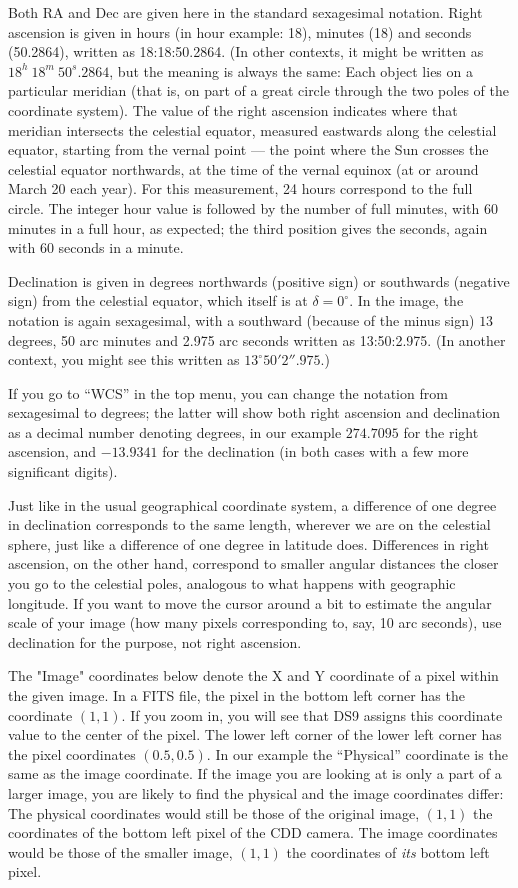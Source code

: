 \documentclass[twocolumn,apj]{openjournal}
\begin{document}
Both RA and Dec are given here in the standard sexagesimal notation. Right ascension is given in hours (in hour example: 18), minutes (18) and seconds (50.2864), written as 18:18:50.2864. (In other contexts, it might be written as $18^h\:18^m\:50^s.2864$, but the meaning is always the same: Each object lies on a particular meridian (that is, on part of a great circle through the two poles of the coordinate system). The value of the right ascension indicates where that meridian intersects the celestial equator, measured eastwards along the celestial equator, starting from the vernal point --- the point where the Sun crosses the celestial equator northwards, at the time of the vernal equinox (at or around March 20 each year). For this measurement, 24 hours correspond to the full circle. The integer hour value is followed by the number of full minutes, with 60 minutes in a full hour, as expected; the third position gives the seconds, again with 60 seconds in a minute.

Declination is given in degrees northwards (positive sign) or southwards (negative sign) from the celestial equator, which itself is at $\delta=0^{\circ}$. In the image, the notation is again sexagesimal, with a southward (because of the minus sign) $13$ degrees, 50 arc minutes and 2.975 arc seconds written as 13:50:2.975. (In another context, you might see this written as $13^{\circ}50'2''.975.$)

If you go to ``WCS'' in the top menu, you can change the notation from sexagesimal to degrees; the latter will show both right ascension and declination as a decimal number denoting degrees, in our example $274.7095$ for the right ascension, and $-13.9341$ for the declination (in both cases with a few more significant digits).

Just like in the usual geographical coordinate system, a difference of one degree in declination corresponds to the same length, wherever we are on the celestial sphere, just like a difference of one degree in latitude does. Differences in right ascension, on the other hand, correspond to smaller angular distances the closer you go to the celestial poles, analogous to what happens with geographic longitude. If you want to move the cursor around a bit to estimate the angular scale of your image (how many pixels corresponding to, say, 10 arc seconds), use declination for the purpose, not right ascension. 

The "Image" coordinates below denote the X and Y coordinate of a pixel within the given image. In a FITS file, the pixel in the bottom left corner has the coordinate $(1,1)$. If you zoom in, you will see that DS9 assigns this coordinate value to the center of the pixel. The lower left corner of the lower left corner has the pixel coordinates $(0.5,0.5)$. In our example the ``Physical'' coordinate is the same as the image coordinate. If the image you are looking at is only a part of a larger image, you are likely to find the physical and the image coordinates differ: The physical coordinates would still be those of the original image, $(1,1)$ the coordinates of the bottom left pixel of the CDD camera. The image coordinates would be those of the smaller image, $(1,1)$ the coordinates of {\em its} bottom left pixel.
\end{document}
